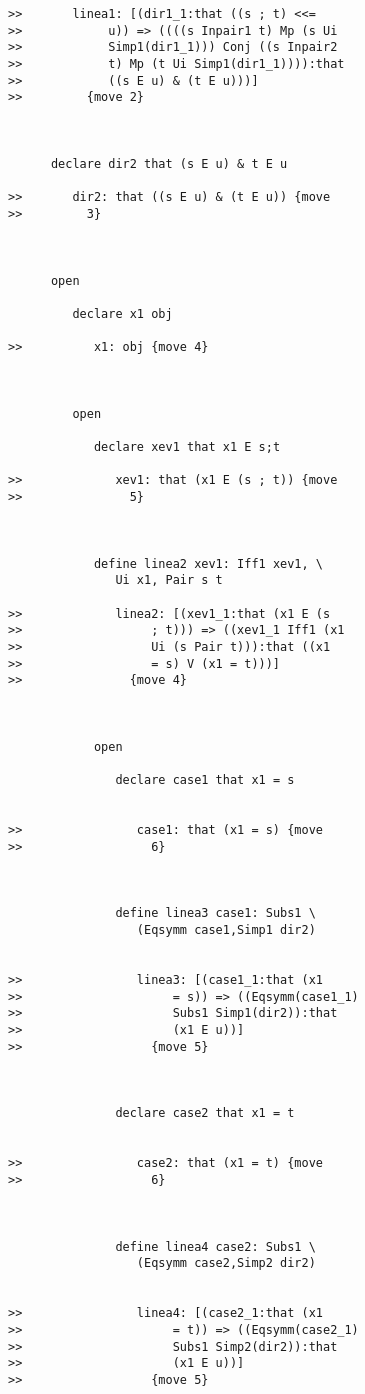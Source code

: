 \documentclass[12pt]{article}
\begin{document}
\begin{verbatim}
>>       linea1: [(dir1_1:that ((s ; t) <<=
>>            u)) => ((((s Inpair1 t) Mp (s Ui
>>            Simp1(dir1_1))) Conj ((s Inpair2
>>            t) Mp (t Ui Simp1(dir1_1)))):that
>>            ((s E u) & (t E u)))]
>>         {move 2}



      declare dir2 that (s E u) & t E u

>>       dir2: that ((s E u) & (t E u)) {move
>>         3}



      open

         declare x1 obj

>>          x1: obj {move 4}



         open

            declare xev1 that x1 E s;t

>>             xev1: that (x1 E (s ; t)) {move
>>               5}



            define linea2 xev1: Iff1 xev1, \
               Ui x1, Pair s t

>>             linea2: [(xev1_1:that (x1 E (s
>>                  ; t))) => ((xev1_1 Iff1 (x1
>>                  Ui (s Pair t))):that ((x1
>>                  = s) V (x1 = t)))]
>>               {move 4}



            open

               declare case1 that x1 = s


>>                case1: that (x1 = s) {move
>>                  6}



               define linea3 case1: Subs1 \
                  (Eqsymm case1,Simp1 dir2)


>>                linea3: [(case1_1:that (x1
>>                     = s)) => ((Eqsymm(case1_1)
>>                     Subs1 Simp1(dir2)):that
>>                     (x1 E u))]
>>                  {move 5}



               declare case2 that x1 = t


>>                case2: that (x1 = t) {move
>>                  6}



               define linea4 case2: Subs1 \
                  (Eqsymm case2,Simp2 dir2)


>>                linea4: [(case2_1:that (x1
>>                     = t)) => ((Eqsymm(case2_1)
>>                     Subs1 Simp2(dir2)):that
>>                     (x1 E u))]
>>                  {move 5}




\end{verbatim}
\end{document}
